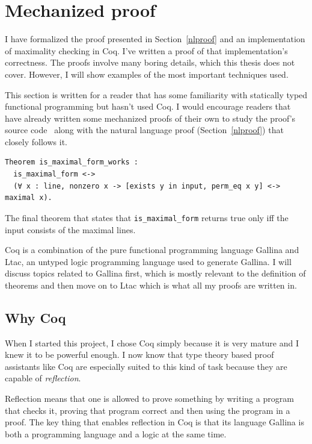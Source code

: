 \documentclass[english, 12pt, a4paper, sci, a-1b, online]{aaltothesis}
\newcommand\icoq[1]{\texttt{#1}}
\begin{document}
\section{Mechanized proof}\label{mechproof}

I have formalized the proof presented in Section~\ref{nlproof} and an implementation of maximality checking in Coq. I've written a proof of that implementation's correctness. The proofs involve many boring details, which this thesis does not cover. However, I will show examples of the most important techniques used.

This section is written for a reader that has some familiarity with statically typed functional programming but hasn't used Coq. I would encourage readers that have already written some mechanized proofs of their own to study the proof's source code~\cite{source_code} along with the natural language proof (Section~\ref{nlproof}) that closely follows it.

\begin{listing}[h]
\begin{verbatim}
Theorem is_maximal_form_works :
  is_maximal_form <->
  (∀ x : line, nonzero x -> [exists y in input, perm_eq x y] <-> maximal x).
\end{verbatim}
\caption{The final theorem that states that \icoq{is_maximal_form} returns true only iff the input consists of the maximal lines.}
\end{listing}

Coq is a combination of the pure functional programming language Gallina and Ltac, an untyped logic programming language used to generate Gallina. I will discuss topics related to Gallina first, which is mostly relevant to the definition of theorems and then move on to Ltac which is what all my proofs are written in.

\subsection{Why Coq}

When I started this project, I chose Coq simply because it is very mature and I knew it to be powerful enough. I now know that type theory based proof assistants like Coq are especially suited to this kind of task because they are capable of \emph{reflection}.

Reflection means that one is allowed to prove something by writing a program that checks it, proving that program correct and then using the program in a proof. The key thing that enables reflection in Coq is that its language Gallina is both a programming language and a logic at the same time.
\end{document}
